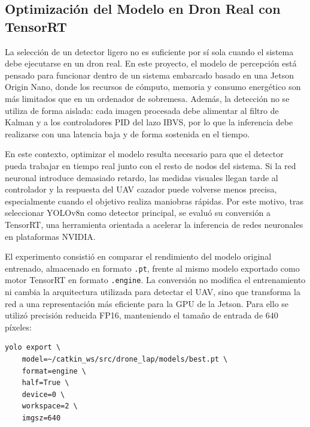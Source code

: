 \subsection{Optimización del Modelo en Dron Real con TensorRT}

La selección de un detector ligero no es suficiente por sí sola cuando el sistema debe ejecutarse en un dron real. En este proyecto, el modelo de percepción está pensado para funcionar dentro de un sistema embarcado basado en una Jetson Origin Nano, donde los recursos de cómputo, memoria y consumo energético son más limitados que en un ordenador de sobremesa. Además, la detección no se utiliza de forma aislada: cada imagen procesada debe alimentar al filtro de Kalman y a los controladores PID del lazo IBVS, por lo que la inferencia debe realizarse con una latencia baja y de forma sostenida en el tiempo.

\vspace{0.3cm}

En este contexto, optimizar el modelo resulta necesario para que el detector pueda trabajar en tiempo real junto con el resto de nodos del sistema. Si la red neuronal introduce demasiado retardo, las medidas visuales llegan tarde al controlador y la respuesta del UAV cazador puede volverse menos precisa, especialmente cuando el objetivo realiza maniobras rápidas. Por este motivo, tras seleccionar YOLOv8n como detector principal, se evaluó su conversión a TensorRT, una herramienta orientada a acelerar la inferencia de redes neuronales en plataformas NVIDIA.

\vspace{0.3cm}

El experimento consistió en comparar el rendimiento del modelo original entrenado, almacenado en formato \texttt{.pt}, frente al mismo modelo exportado como motor TensorRT en formato \texttt{.engine}. La conversión no modifica el entrenamiento ni cambia la arquitectura utilizada para detectar el UAV, sino que transforma la red a una representación más eficiente para la GPU de la Jetson. Para ello se utilizó precisión reducida FP16, manteniendo el tamaño de entrada de $640$ píxeles:

\begin{lstlisting}[frame=none, numbers=none, backgroundcolor=\color{white}]
yolo export \
    model=~/catkin_ws/src/drone_lap/models/best.pt \
    format=engine \
    half=True \
    device=0 \
    workspace=2 \
    imgsz=640
\end{lstlisting}

